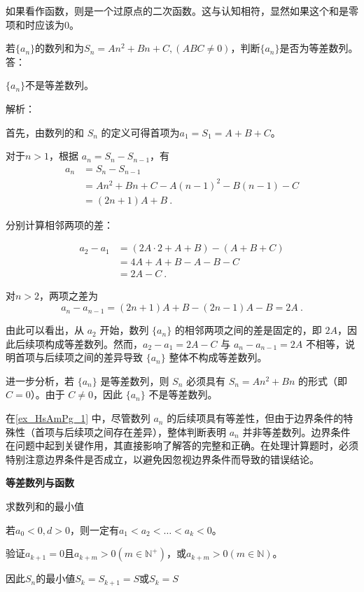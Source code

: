 如果看作函数，则是一个过原点的二次函数。这与认知相符，显然如果这个和是零项和时应该为$0$。


\begin{example}{若$\{a_n\}$的数列和为$S_n=An^2+Bn+C,(ABC\neq0)$，判断$\{a_n\}$是否为等差数列。}\label{ex_HsAmPg_1}
答：

$\{a_n\}$不是等差数列。

解析：

首先，由数列的和 $S_n$ 的定义可得首项为$a_1=S_1=A+B+C$。

对于$n>1$，根据 $a_n = S_n - S_{n-1}$，有
\begin{equation}
\begin{split}
a_n &= S_n-S_{n-1}\\
&=An^2+Bn+C-A(n-1)^2-B(n-1)-C\\
&=(2n+1)A+B~.
\end{split}
\end{equation}

分别计算相邻两项的差：

\begin{equation}
\begin{split}
a_2 - a_1 &= (2A \cdot 2 + A + B) - (A + B + C) \\
&= 4A + A + B - A - B - C \\
&= 2A - C~.
\end{split}
\end{equation}

对$n>2$，两项之差为
\begin{equation}
a_n-a_{n-1} = (2n+1)A+B-(2n-1)A-B=2A~.
\end{equation}

由此可以看出，从 $a_2$ 开始，数列 $\{a_n\}$ 的相邻两项之间的差是固定的，即 $2A$，因此后续项构成等差数列。然而，$a_2 - a_1 = 2A - C$ 与 $a_n - a_{n-1} = 2A$ 不相等，说明首项与后续项之间的差异导致 $\{a_n\}$ 整体不构成等差数列。

进一步分析，若 $\{a_n\}$ 是等差数列，则 $S_n$ 必须具有 $S_n = An^2 + Bn$ 的形式（即 $C = 0$）。由于 $C \neq 0$，因此 $\{a_n\}$ 不是等差数列。
\end{example}

在\autoref{ex_HsAmPg_1} 中，尽管数列 ${a_n}$ 的后续项具有等差性，但由于边界条件的特殊性（首项与后续项之间存在差异），整体判断表明 ${a_n}$ 并非等差数列。边界条件在问题中起到关键作用，其直接影响了解答的完整和正确。在处理计算题时，必须特别注意边界条件是否成立，以避免因忽视边界条件而导致的错误结论。

\textbf{等差数列与函数}

求数列和的最小值

若$a_0<0,d>0$，则一定有$a_1<a_2<\dots<a_{k}<0$。

验证$a_{k+1} =0$且$a_{k+m}>0(m\in\mathbb{N}^+)$，或$a_{k+m}>0(m\in\mathbb{N})$。

因此$S_n$的最小値$S_k=S_{k+1}=S$或$S_k=S$
